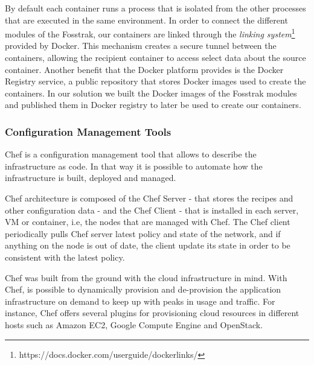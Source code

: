 By default each container runs a process that is isolated from the other processes that are executed in
the same environment. In order to connect the different modules of the Fosstrak, our containers are
linked through the \textit{linking system}\footnote{https://docs.docker.com/userguide/dockerlinks/} provided by Docker.
This mechanism creates a secure tunnel between the containers, allowing the recipient container to access select
data about the source container. Another benefit that the Docker platform provides is the Docker Registry service,
a public repository that stores Docker images used to create the containers. In our solution we built the Docker
images of the Fosstrak modules and published them in Docker registry to later be used to create our containers.
\subsubsection{Configuration Management Tools}
\label{subs:cm_tools}
Chef is a configuration management tool that allows to describe the infrastructure as code. In that way
it is possible to automate how the infrastructure is built, deployed and managed.

Chef architecture is composed of the Chef Server - that stores the recipes and other configuration data -
and the  Chef Client - that is installed in each server, VM or container, i.e, the nodes that are managed with Chef.
The Chef client periodically pulls Chef server latest policy and state of the network, and if anything on the
node is out of date, the client update its state in order to be consistent with the latest policy.

Chef was built from the ground with the cloud infrastructure in mind. With Chef, is possible to dynamically
provision and de-provision the application infrastructure on demand to keep up with peaks in usage and traffic.
For instance, Chef offers several plugins for provisioning cloud resources in different hosts such as
Amazon EC2, Google Compute Engine and OpenStack.
